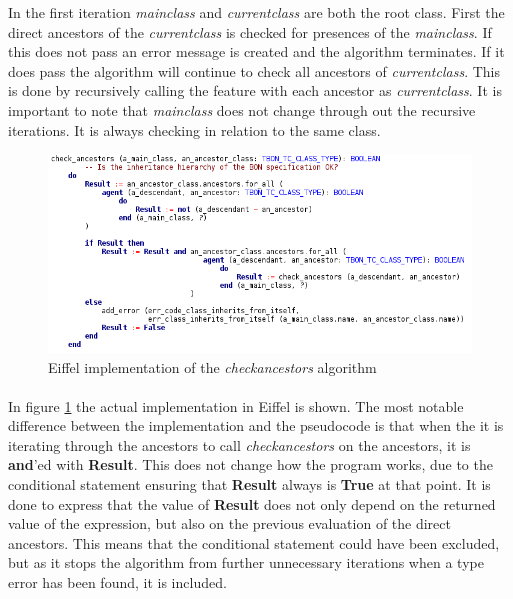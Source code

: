 In the first iteration \textit{main}\textunderscore\textit{class} and \textit{current}\textunderscore\textit{class} are both the root class. First the direct ancestors of the \textit{current}\textunderscore\textit{class}  is checked for presences of the \textit{main}\textunderscore\textit{class}. If this does not pass an error message is created and the algorithm terminates. If it does pass the algorithm will continue to check all ancestors of \textit{current}\textunderscore\textit{class}. This is done by recursively calling the feature with each ancestor as \textit{current}\textunderscore\textit{class}. It is important to note that \textit{main}\textunderscore\textit{class} does not change through out the recursive iterations. It is always checking in relation to the same class.

\begin{figure}
\centerline{
\includegraphics[scale=0.7]{images/check_ancestors_eiffel_code.png}
}
\caption{Eiffel implementation of the \textit{check}\textunderscore\textit{ancestors} algorithm}
\label{fig:eiffel_check_ancestors}
\end{figure}

\paragraph{}
In figure \ref{fig:eiffel_check_ancestors} the actual implementation in Eiffel is shown. The most notable difference between the implementation and the pseudocode is that when the it is iterating through the ancestors to call \textit{check}\textunderscore\textit{ancestors} on the ancestors, it is \textbf{and}'ed with \textbf{Result}. This does not change how the program works, due to the conditional statement ensuring that \textbf{Result} always is \textbf{True} at that point. It is done to express that the value of \textbf{Result} does not only depend on the returned value of the expression, but also on the previous evaluation of the direct ancestors. This means that the conditional statement could have been excluded, but as it stops the algorithm from further unnecessary iterations when a type error has been found, it is included.


